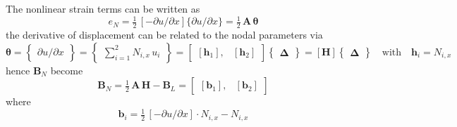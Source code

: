 The nonlinear strain terms can be written as 
\begin{equation}
e_ N =  \tfrac{1}{2} \,
 [-\partial u / \partial x ]
\{\partial u / \partial x\}
= \tfrac{1}{2} \, \mathbf{A} \, \boldsymbol{\theta}
\end{equation}
the derivative of displacement can be related to the nodal parameters via
\begin{equation}
\boldsymbol{\theta} =  \begin{Bmatrix}
\partial u / \partial x
\end{Bmatrix}
= \begin{Bmatrix}
\sum\nolimits_{i=1}^2 N_{i,x} \, u_i
\end{Bmatrix} 
= \begin{bmatrix}
[\mathbf{h}_1], & [\mathbf{h}_2]
\end{bmatrix}  \begin{Bmatrix} \boldsymbol{\Delta} \end{Bmatrix}  
= [\mathbf{H}] \begin{Bmatrix} \boldsymbol{\Delta} \end{Bmatrix} \quad \text{with} \quad \mathbf{h}_i = N_{i,x}  
\end{equation}
hence $\mathbf{B}_N$ become
\begin{equation}
\mathbf{B}_N = \tfrac{1}{2} \, \mathbf{A} \, \mathbf{H} - \mathbf{B}_L =  \begin{bmatrix}
[\mathbf{b}_1], & [\mathbf{b}_2] 
\end{bmatrix} 
\end{equation}
where
\begin{equation}
\mathbf{b}_i  =   
\tfrac{1}{2} \, [-\partial u / \partial x] \cdot
N_{i,x} - N_{i,x} 
\end{equation}


